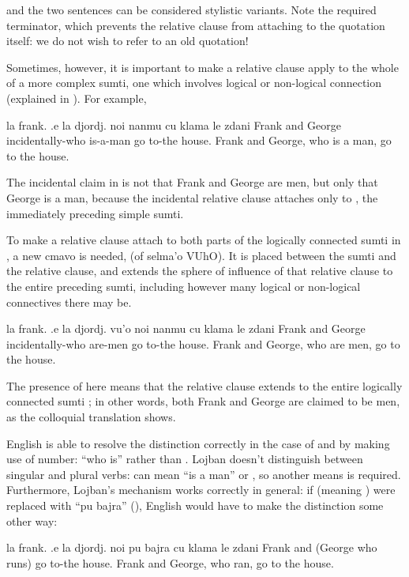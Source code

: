 {\noindent}and the two sentences can be considered stylistic variants.
    Note the required  terminator, which prevents the
    relative clause from attaching to the quotation itself: we do
    not wish to refer to an old quotation! 

Sometimes, however, it is important to make a relative
    clause apply to the whole of a more complex sumti, one which
    involves logical or non-logical connection (explained in ). For example,
\begin{example}
la frank. .e la djordj. noi nanmu\n
\T	cu klama le zdani\n
Frank and George incidentally-who is-a-man\n
\T	go to-the house.\n
Frank and George, who is a man, go to the house.
\end{example}

The incidental claim in  is
    not that Frank and George are men, but only that George is a
    man, because the incidental relative clause attaches only to
    , the immediately preceding simple sumti.

To make a relative clause attach to both parts of the
    logically connected sumti in , a
    new cmavo is needed,  (of selma'o VUhO). It is placed
    between the sumti and the relative clause, and extends the
    sphere of influence of that relative clause to the entire
    preceding sumti, including however many logical or non-logical
    connectives there may be.
\begin{example}
la frank. .e la djordj. vu'o noi nanmu\n
\T	cu klama le zdani\n
Frank and George incidentally-who are-men\n
\T	go to-the house.\n
Frank and George, who are men, go to the house.
\end{example}

The presence of  here means that the relative clause
     extends to the entire logically connected sumti
    ; in other words, both Frank and
    George are claimed to be men, as the colloquial translation
    shows.

English is able to resolve the distinction correctly in the
    case of  and  by making use of number: ``who
    is'' rather than . Lojban doesn't distinguish
    between singular and plural verbs:  can mean ``is a
    man'' or , so another means is required.
    Furthermore, Lojban's mechanism works correctly in general: if
     (meaning ) were replaced with ``pu
    bajra'' (), English would have to make the distinction
    some other way:
\begin{example}
la frank. .e la djordj. noi pu bajra\n
\T	cu klama le zdani\n
Frank and (George who  runs)\n
\T	go to-the house.\n
Frank and George, who ran, go to the house.
\end{example}


